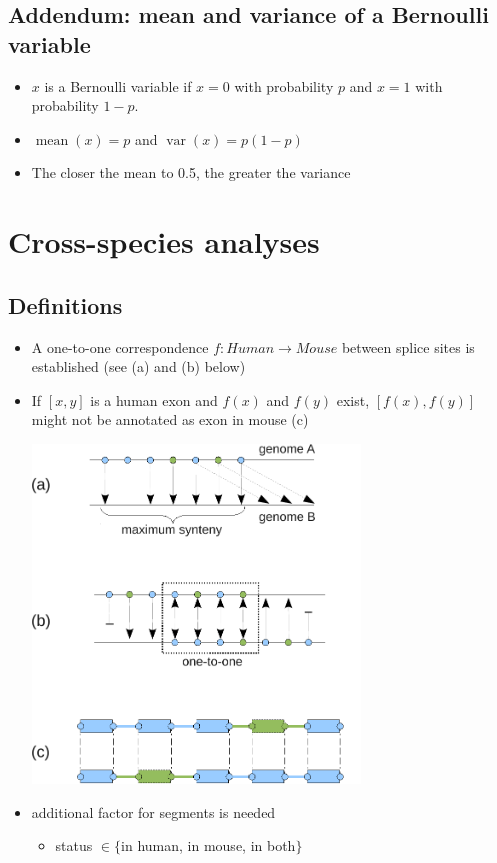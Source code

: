 \documentclass{article}
\DeclareMathOperator{\Var}{var}
\DeclareMathOperator{\mean}{mean}
\begin{document}
\subsection{Addendum: mean and variance of a Bernoulli variable}
\begin{itemize}
\item $x$ is a Bernoulli variable if $x=0$ with probability $p$ and $x=1$ with probability $1-p$.
\item $\mean(x)=p$ and $\Var(x)=p(1-p)$
\item The closer the mean to 0.5, the greater the variance
\end{itemize}
\clearpage


\section{Cross-species analyses}

\subsection{Definitions}
\begin{itemize}
\item A one-to-one correspondence $f:Human{\to}Mouse$ between splice sites is established (see (a) and (b) below)
\item If $[x,y]$ is a human exon and $f(x)$ and $f(y)$ exist, $[f(x),f(y)]$ might not be annotated as exon in mouse (c)
\begin{center}
\includegraphics[height=9cm]{Latex/main_legend_2.pdf}
\end{center}
\item additional factor for segments is needed
\begin{itemize}
\item status $\in\{$in human, in mouse, in both$\}$
\end{itemize}
\end{itemize}
\clearpage
\end{document}
